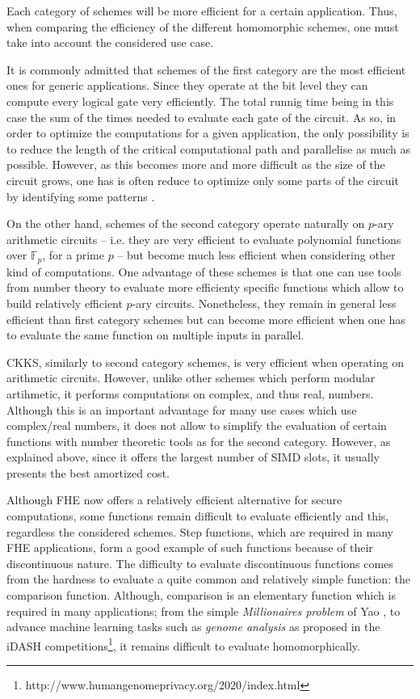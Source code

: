 Each category of schemes will be more efficient for a certain application. Thus, when comparing the efficiency of the different homomorphic schemes, one must take into account the considered use case.

It is commonly admitted that schemes of the first category are the most efficient ones for generic applications. Since they operate at the bit level they can compute every logical gate very efficiently. The total runnig time being in this case the sum of the times needed to evaluate each gate of the circuit. As so, in order to optimize the computations for a given application, the only possibility is to reduce the length of the critical computational path and parallelise as much as possible. However, as this becomes more and more difficult as the size of the circuit grows, one has is often reduce to optimize only some parts of the circuit by identifying some patterns \cite{ACS20}.

On the other hand, schemes of the second category operate naturally on $p$-ary arithmetic circuits -- i.e. they are very efficient to evaluate polynomial functions over $\mathbb{F}_p$, for a prime $p$ -- but become much less efficient when considering other kind of computations. One advantage of these schemes is that one can use tools from number theory to evaluate more efficienty specific functions which allow to build relatively efficient $p$-ary circuits. Nonetheless, they remain in general less efficient than first category schemes but can become more efficient when one has to evaluate the same function on multiple inputs in parallel. 

CKKS, similarly to second category schemes, is very efficient when operating on arithmetic circuits. However, unlike other schemes which perform modular artihmetic, it performs computations on complex, and thus real, numbers. Although this is an important  advantage for many use cases which use complex/real numbers, it does not allow to simplify the evaluation of certain functions with number theoretic tools as for the second category. However, as explained above, since it offers the largest number of \ac{SIMD} slots, it usually presents the best amortized cost.

Although \ac{FHE} now offers a relatively efficient alternative for secure computations, some functions remain difficult to evaluate efficiently and this, regardless the considered schemes. Step functions, which are required in many \ac{FHE} applications, form a good example of such functions because of their discontinuous nature. The difficulty to evaluate discontinuous functions comes from the hardness to evaluate a quite common and relatively simple function: the comparison function. Although, comparison is an elementary function which is required in many applications; from the simple \emph{Millionaires problem} of Yao \cite{Yao82}, to advance machine learning tasks such as \emph{genome analysis} as proposed in the iDASH competitions\footnote{http://www.humangenomeprivacy.org/2020/index.html}, it remains difficult to evaluate homomorphically.

